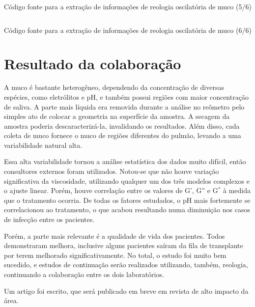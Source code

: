 		\begin{listing}[h]
			\inputminted{python}{./python/extracao_muco5.py}
			\caption{Código fonte para a extração de informações de reologia oscilatória de muco (5/6)}
			\label{lst:extracao_muco5}
		\end{listing}
		
		\begin{listing}[h]
			\inputminted{python}{./python/extracao_muco6.py}
			\caption{Código fonte para a extração de informações de reologia oscilatória de muco (6/6)} 
			\label{lst:extracao_muco6}
		\end{listing}
		
		\FloatBarrier
		
		\chapter{Resultado da colaboração}
		
		A muco é bastante heterogêneo, dependendo da concentração de diversas espécies, como eletrólitos e pH, e também possui regiões com maior concentração de saliva. A parte mais líquida era removida durante a análise no reômetro pelo simples ato de colocar a geometria na superfície da amostra. A secagem da amostra poderia descaracterizá-la, invalidando os resultados. Além disso, cada coleta de muco fornece o muco de regiões diferentes do pulmão, levando a uma variabilidade natural alta.
		
		Essa alta variabilidade tornou a análise estatística dos dados muito difícil, então consultores externos foram utilizados. Notou-se que não houve variação significativa da viscosidade, utilizando qualquer um dos três modelos complexos e o ajuste linear.  Porém, houve correlação entre os valores de G', G'' e G\(^*\) à medida que o tratamento ocorria. De todas os fatores estudados, o pH mais fortemente se correlacionou ao tratamento, o que acabou resultando numa diminuição nos casos de infecção entre os pacientes.
		
		Porém, a parte mais relevante é a qualidade de vida dos pacientes. Todos demonstraram melhora, inclusive alguns pacientes saíram da fila de transplante por terem melhorado significativamente. No total, o estudo foi muito bem sucedido, e estudos de continuação serão realizados utilizando, também, reologia, continuando a colaboração entre os dois laboratórios.
		
		Um artigo foi escrito, que será publicado em breve em revista de alto impacto da área. %
		
